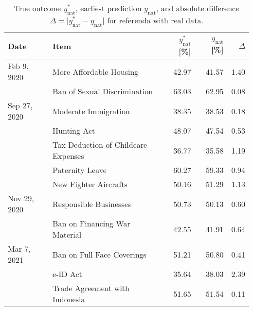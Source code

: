 \begin{table}
	\centering
	\caption{
		True outcome $y^*_{\textrm{nat}}$, earliest prediction $y_{\textrm{nat}}$, and absolute difference $\Delta = \vert y^*_{\textrm{nat}} - y_{\textrm{nat}} \vert $ for referenda with real data.
	}
	\label{pdk:tab:real_votes}
	\begin{tabular}{llrrr}
		\toprule
		Date         & Item                                & $y^*_{\textrm{nat}}$ [\%] & $y_{\textrm{nat}}$ [\%] & $\Delta$ \\
		\midrule

		Feb 9, 2020  & More Affordable Housing             & 42.97                     & 41.57                   & 1.40     \\
		             & Ban of Sexual Discrimination        & 63.03                     & 62.95                   & 0.08     \\
		Sep 27, 2020 & Moderate Immigration                & 38.35                     & 38.53                   & 0.18     \\
		             & Hunting Act                         & 48.07                     & 47.54                   & 0.53     \\
		             & Tax Deduction of Childcare Expenses & 36.77                     & 35.58                   & 1.19     \\
		             & Paternity Leave                     & 60.27                     & 59.33                   & 0.94     \\
		             & New Fighter Aircrafts               & 50.16                     & 51.29                   & 1.13     \\
		Nov 29, 2020 & Responsible Businesses              & 50.73                     & 50.13                   & 0.60     \\
		             & Ban on Financing War Material       & 42.55                     & 41.91                   & 0.64     \\
		Mar 7, 2021  & Ban on Full Face Coverings          & 51.21                     & 50.80                   & 0.41     \\
		             & e-ID Act                            & 35.64                     & 38.03                   & 2.39     \\
		             & Trade Agreement with Indonesia      & 51.65                     & 51.54                   & 0.11     \\

		\bottomrule
	\end{tabular}
\end{table}

